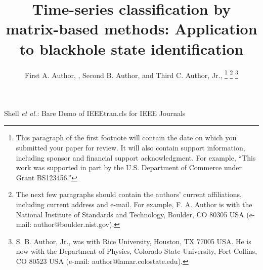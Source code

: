 \documentclass[journal]{IEEEtran}
\begin{document}
	
	\title{ Time-series classification by matrix-based methods: Application to blackhole state identification}
	
	\author{First A. Author, , Second B. Author, and Third C. Author, Jr., 
		\thanks{This paragraph of the first footnote will contain the date on which you submitted your paper for review. It will also contain support information, including sponsor and financial support acknowledgment. For example, ``This work was supported in part by the U.S. Department of Commerce under Grant BS123456.'' }
		\thanks{The next few paragraphs should contain the authors' current affiliations, including current address and e-mail. For example, F. A. Author is with the National Institute of Standards and Technology, Boulder, CO 80305 USA (e-mail: author@boulder.nist.gov).}
		\thanks{S. B. Author, Jr., was with Rice University, Houston, TX 77005 USA. He is now with the Department of Physics, Colorado State University, Fort Collins, CO 80523 USA (e-mail: author@lamar.colostate.edu).}}
	
	{Shell \MakeLowercase{\textit{et al.}}: Bare Demo of IEEEtran.cls for IEEE Journals}
	\maketitle
	
\end{document}
